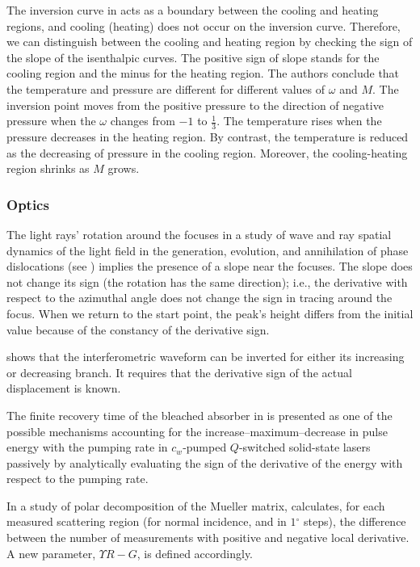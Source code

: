 \documentclass[11pt]{book}
\begin{document}
The inversion curve in \cite{abdusattar2021joule} acts as a boundary
between the cooling and heating regions, and cooling (heating) does
not occur on the inversion curve. Therefore, we can distinguish between
the cooling and heating region by checking the sign of the slope of
the isenthalpic curves. The positive sign of slope stands for the
cooling region and the minus for the heating region. The authors conclude
that the temperature and pressure are different for different values
of $\omega$ and $M$. The inversion point moves from the positive
pressure to the direction of negative pressure when the $\omega$
changes from $-1$ to $\frac{1}{3}$. The temperature rises when the
pressure decreases in the heating region. By contrast, the temperature
is reduced as the decreasing of pressure in the cooling region. Moreover,
the cooling-heating region shrinks as $M$ grows.


\subsubsection{Optics}

The light rays' rotation around the focuses in a study of wave and ray spatial dynamics of the light field in the generation,
evolution, and annihilation of phase dislocations (see \cite{aksenov2002wave})
implies the presence of a slope near the focuses. The slope does not
change its sign (the rotation has the same direction); i.e., the derivative
with respect to the azimuthal angle does not change the sign in tracing
around the focus. When we return to the start point, the peak's height
differs from the initial value because of the constancy of the derivative
sign.

\cite{giuliani2005laser} shows that the interferometric waveform can be inverted
for either its increasing or decreasing branch. It requires that the
derivative sign of the actual displacement is known.

The finite recovery time of the bleached absorber in \cite{li2006maximum}
is presented as one of the possible mechanisms accounting for the
increase--maximum--decrease in pulse energy with the pumping rate
in $c_{w}$-pumped $Q$-switched solid-state lasers passively by analytically
evaluating the sign of the derivative of the energy with respect to
the pumping rate.

In a study of polar decomposition of the Mueller matrix, \cite{sanz2011polar} calculates, for each measured scattering region
(for normal incidence, and in $1{^{\circ}}$ steps), the difference
between the number of measurements with positive and negative local
derivative. A new parameter, $\Upsilon R-G$, is defined accordingly.
\end{document}
